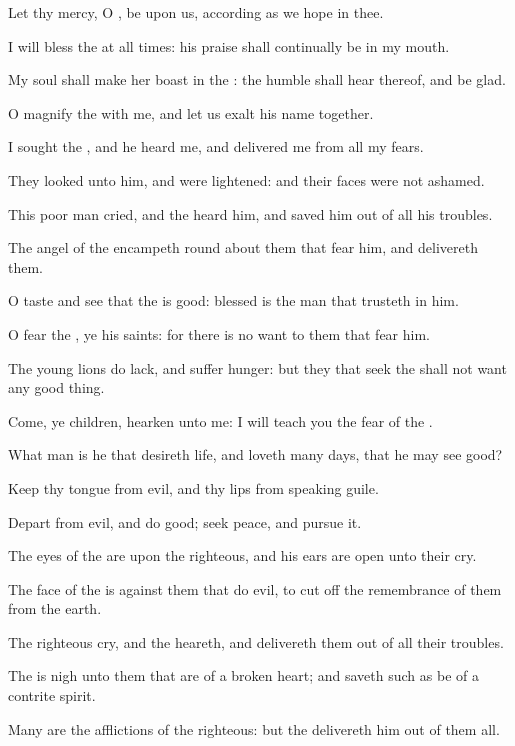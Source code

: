 \Verse Let thy mercy, O \LORD, be upon us, according as we hope in thee.




\Chapter
\Verse I will bless the \LORD at all times: his praise shall continually be in my mouth.

\Verse My soul shall make her boast in the \LORD: the humble shall hear thereof, and be glad.

\Verse O magnify the \LORD with me, and let us exalt his name together.

\Verse I sought the \LORD, and he heard me, and delivered me from all my fears.

\Verse They looked unto him, and were lightened: and their faces were not ashamed.

\Verse This poor man cried, and the \LORD heard him, and saved him out of all his troubles.

\Verse The angel of the \LORD encampeth round about them that fear him, and delivereth them.

\Verse O taste and see that the \LORD is good: blessed is the man that trusteth in him.

\Verse O fear the \LORD, ye his saints: for there is no want to them that fear him.

\Verse The young lions do lack, and suffer hunger: but they that seek the \LORD shall not want any good thing.

\Verse Come, ye children, hearken unto me: I will teach you the fear of the \LORD.

\Verse What man is he that desireth life, and loveth many days, that he may see good?

\Verse Keep thy tongue from evil, and thy lips from speaking guile.

\Verse Depart from evil, and do good; seek peace, and pursue it.

\Verse The eyes of the \LORD are upon the righteous, and his ears are open unto their cry.

\Verse The face of the \LORD is against them that do evil, to cut off the remembrance of them from the earth.

\Verse The righteous cry, and the \LORD heareth, and delivereth them out of all their troubles.

\Verse The \LORD is nigh unto them that are of a broken heart; and saveth such as be of a contrite spirit.

\Verse Many are the afflictions of the righteous: but the \LORD delivereth him out of them all.

